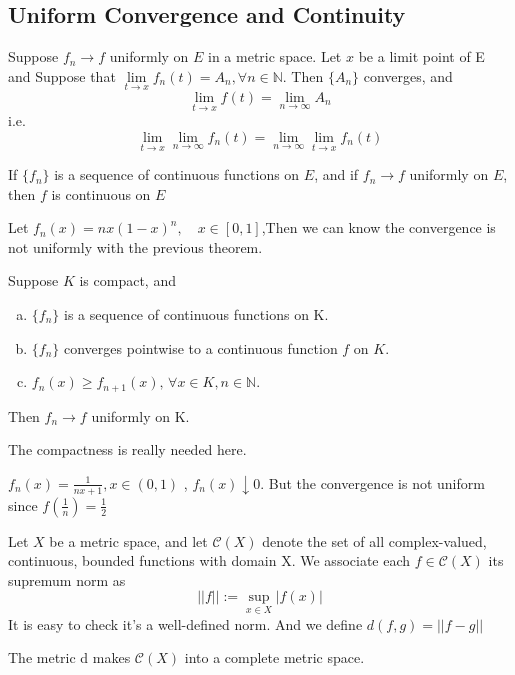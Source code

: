 \subsection{Uniform Convergence and Continuity}
\begin{theorem}
     Suppose  $ f_n\to f  $ uniformly on  $ E  $ in a metric space. Let  $ x $ be a limit point of E and Suppose that  $ \lim\limits_{t\to x}f_n(t)=A_n, \forall n\in \mathbb{N }   $.
     Then   $ \{A_n \} $ converges, and 
     \[\lim\limits_{t\to x}f(t)=\lim\limits_{n\to\infty}A_n     \]
     i.e.
     \[\lim\limits_{t\to x}\lim\limits_{n\to \infty}f_n(t)=\lim\limits_{n\to \infty } \lim\limits_{t\to x } f_n(t)      \]
\end{theorem}
\begin{theorem}
    If  $ \{f_n \}  $ is a sequence of continuous functions on  $ E  $, and if  $ f_n\to f  $ uniformly on $ E  $, then  $ f  $ is continuous on  $ E $ 
\end{theorem}
\begin{example}
    Let  $ f_n(x)=nx(1-x)^n,\quad x\in [0,1] $,Then we can know the convergence is not uniformly with the previous theorem.
\end{example}
\begin{theorem}
    Suppose  $ K $ is compact, and 
    \begin{enumerate}[(a)]
        \item  $ \{f_n \} $ is a sequence of continuous functions on K.
        \item  $ \{f_n \} $ converges pointwise to a continuous function  $ f  $ on  $ K $.
        \item  $ f_n(x)\geqslant f_{n+1}(x),\,\forall x\in K,n\in \mathbb{N } $. 
    \end{enumerate}
    Then  $ f_n \rightarrow f  $ uniformly on K.
\end{theorem}
\begin{example}
    The compactness is really needed here.

     $ f_n(x)=\frac{1 }{nx+1},x\in (0,1 ) $ , $ f_n(x)\downarrow 0   $. But the convergence is not uniform since  $ f(\frac{1}{n })=\frac{1 }{2} $ 
\end{example}
Let  $ X  $ be a metric space, and let  $ \mathscr{C}(X) $ denote the set of all complex-valued, continuous, bounded functions with domain X.
We associate each  $ f\in \mathscr{C}(X) $ its supremum norm as 
\[||f||:=\sup\limits_{x\in X}|f(x)|\]
It is easy to check it's a well-defined norm.
And we define  $ d(f,g)=||f-g|| $
\begin{theorem}
    The metric d makes  $ \mathscr{C}(X ) $ into a complete metric space.
\end{theorem} 

